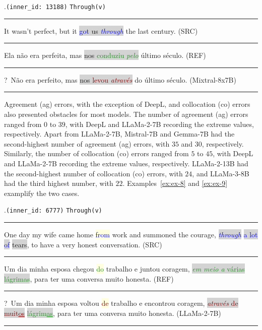 \ex.\texttt{(inner\_id: 13188)} \hfill \texttt{Through(v)}\\[0.3ex]
\noindent\rule{\linewidth}{0.9pt}
It wasn't perfect, but it \colorbox{lightgray}{\textcolor{blue}{got} us \textcolor{blue}{\emph{through}}} the last century. (SRC) \label{ex:ex-7} \\[-0.3ex]
\noindent\rule{\linewidth}{0.3pt}
Ela não era perfeita, mas \colorbox{lightgray}{nos \textcolor{ForestGreen}{conduziu \emph{pelo}}} último século. (REF) \\[-0.3ex]
\noindent\rule{\linewidth}{0.3pt}
?~Não era perfeito, mas \colorbox{lightgray}{nos \textcolor{Maroon}{levou \emph{através}}} do último século. (Mixtral-8x7B) \\[-0.3ex]
\noindent\rule{\linewidth}{0.9pt}


Agreement (ag) errors, with the exception of DeepL, and collocation (co) errors also presented obstacles for most models. The number of agreement (ag) errors ranged from $0$ to $39$, with DeepL and LLaMa-2-7B recording the extreme values, respectively. Apart from LLaMa-2-7B, Mistral-7B and Gemma-7B had the second-highest number of agreement (ag) errors, with $35$ and $30$, respectively. Similarly, the number of collocation (co) errors ranged from $5$ to $45$, with DeepL and LLaMa-2-7B recording the extreme values, respectively. LLaMa-2-13B had the second-highest number of collocation (co) errors, with $24$, and LLaMa-3-8B had the third highest number, with $22$. Examples~\ref{ex:ex-8} and \ref{ex:ex-9} examplify the two cases. 

\ex.\texttt{(inner\_id: 6777)}  \hfill \texttt{Through(v)}\\[0.3ex]
\noindent\rule{\linewidth}{0.9pt}
One day my wife came home \colorbox{lightyellow}{\textcolor{blue}{from}} work and summoned the courage, \colorbox{lightgray}{\textcolor{blue}{ \emph{through}}} \colorbox{lightgray}{\textcolor{blue}{a lot of}} \colorbox{lightgray}{tears}, to have a very honest conversation. (SRC) \label{ex:ex-8} \\[-0.3ex]
\noindent\rule{\linewidth}{0.3pt}
Um dia minha esposa chegou \colorbox{lightyellow}{\textcolor{ForestGreen}{do}} trabalho e juntou coragem, \colorbox{lightgray}{\textcolor{ForestGreen}{\emph{em meio a} várias}} \colorbox{lightgray}{\textcolor{ForestGreen}{lágrimas}}, para ter uma conversa muito honesta. (REF) \\[-0.3ex]
\noindent\rule{\linewidth}{0.3pt}
?~Um dia minha esposa voltou \colorbox{lightyellow}{\textcolor{Maroon}{de}} trabalho e encontrou coragem, \colorbox{lightgray}{\textcolor{Maroon}{\emph{através} de muit\underline{os}}} \colorbox{lightgray}{\textcolor{ForestGreen}{lágrim\underline{as}}}, para ter uma conversa muito honesta.  (LLaMa-2-7B) \\[-0.3ex]
\noindent\rule{\linewidth}{0.9pt}

